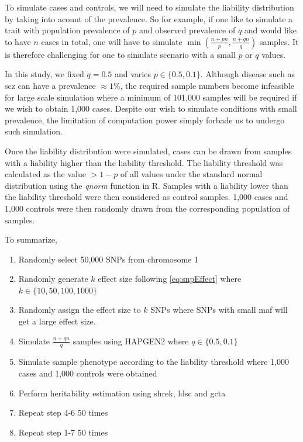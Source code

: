 		To simulate cases and controls, we will need to simulate the liability distribution by taking into acount of the prevalence. 
		So for example, if one like to simulate a trait with population prevalence of $p$ and observed prevalence  of $q$ and would like to have $n$ cases in total, one will have to simulate $\min(\frac{n+pn}{p}, \frac{n+qn}{q})$ samples.
		It is therefore challenging for one to simulate scenario with a small $p$ or $q$ values. 
		
		In this study, we fixed $q=0.5$ and varies $p\in\{0.5,0.1\}$. Although disease such as \gls{scz} can have a prevalence $\approx1\%$, the required sample numbers become infeasible for large scale simulation where a minimum of 101,000 samples will be required if we wish to obtain 1,000 cases.
		Despite our wish to simulate conditions with small prevalence, the limitation of computation power simply forbade us to undergo such simulation. 
		
		Once the liability distribution were simulated, cases can be drawn from samples with a liability higher than the liability threshold. 
		The liability threshold was calculated as the value $> 1-p$ of all values under the standard normal distribution using the \emph{qnorm} function in R. 
		Samples with a liability lower than the liability threshold were then considered as control samples. 
		1,000 cases and 1,000 controls were then randomly drawn from the corresponding population of samples.
		 
		To summarize, 
		\begin{enumerate}
			\item Randomly select 50,000 \glspl{SNP} from chromosome 1
			\item Randomly generate $k$ effect size following \cref{eq:snpEffect} where $k \in \{10,50,100,1000\}$
			\item Randomly assign the effect size to $k$ \glspl{SNP} where \glspl{SNP} with small \gls{maf} will get a large effect size.
			\item Simulate $\frac{n+qn}{q}$ samples using HAPGEN2 where $q\in\{0.5,0.1\}$
			\item Simulate sample phenotype according to the liability threshold where 1,000 cases and 1,000 controls were obtained
			\item Perform heritability estimation using \gls{shrek}, \gls{ldsc} and  \gls{gcta}
			\item Repeat step 4-6 50 times
			\item Repeat step 1-7 50 times
		\end{enumerate}
		
